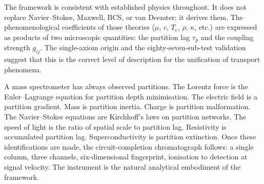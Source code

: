 \documentclass[twocolumn,10pt,a4paper]{article}
\theoremstyle{definition}
\theoremstyle{remark}
\newcommand{\Tcrit}{T_{\mathrm{c}}}
\newcommand{\tauP}{\tau_{\mathrm{p}}}
\begin{document}
The framework is consistent with established physics throughout. It does not replace Navier--Stokes, Maxwell, BCS, or van Deemter; it derives them. The phenomenological coefficients of those theories ($\mu$, $c$, $\Tcrit$, $\rho$, $\kappa$, etc.) are expressed as products of two microscopic quantities: the partition lag $\tauP$ and the coupling strength $g_{ij}$. The single-axiom origin and the eighty-seven-sub-test validation suggest that this is the correct level of description for the unification of transport phenomena.

A mass spectrometer has always observed partitions. The Lorentz force is the Euler--Lagrange equation for partition depth minimisation. The electric field is a partition gradient. Mass is partition inertia. Charge is partition malformation. The Navier--Stokes equations are Kirchhoff's laws on partition networks. The speed of light is the ratio of spatial scale to partition lag. Resistivity is accumulated partition lag. Superconductivity is partition extinction. Once these identifications are made, the circuit-completion chromatograph follows: a single column, three channels, six-dimensional fingerprint, ionisation to detection at signal velocity. The instrument is the natural analytical embodiment of the framework.



\end{document}
